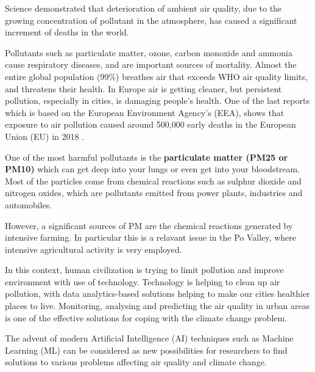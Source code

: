 Science demonstrated that deterioration of ambient air quality, due to the growing concentration of pollutant in the atmosphere, has caused a significant increment of deaths in the world.\par  
Pollutants such as particulate matter, ozone, carbon monoxide and ammonia cause respiratory diseases, and are important sources of mortality.
Almost the entire global population (99\%) breathes air that exceeds WHO air quality limits, and threatens their health.\newline
In Europe air is getting cleaner, but persistent pollution, especially in cities, is damaging people’s health. One of the last reports which is based on the European Environment Agency’s (EEA), shows that exposure to air pollution caused around 500,000 early deaths in the European Union (EU) in 2018 \cite{european2018air}.\par
One of the most harmful pollutants is the \textbf{particulate matter (PM25 or PM10)} which can get deep into your lungs or even get into your bloodstream.\newline
Most of the particles come from chemical reactions such as sulphur dioxide and nitrogen oxides, which are pollutants emitted from power plants, industries and automobiles.\par
However, a significant sources of PM are the chemical reactions generated by intensive farming.
In particular this is a relavant issue in the Po Valley, where intensive agricultural activity is very employed.\par
In this context, human civilization is trying to limit pollution and improve environment with use of technology.\newline
Technology is helping to clean up air pollution, with data analytics-based solutions helping to make our cities healthier places to live.\newline
Monitoring, analysing and predicting the air quality in urban areas is one of the effective solutions for coping with the climate change problem.\par
The advent of modern Artificial Intelligence (AI) techniques such as Machine Learning (ML) can be considered as new possibilities for researchers to find solutions to various problems affecting air quality and climate change.
